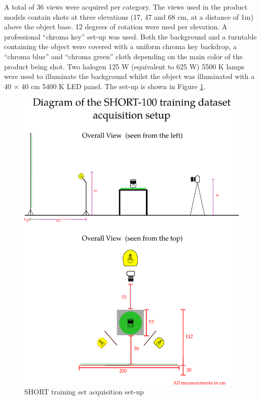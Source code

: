 A total of 36 views were acquired per category. The views used in the product models contain shots at three elevations (17, 47 and 68 cm, at a distance of 1m) above the object base. 12 degrees of rotation were used per elevation. A professional ``chroma key'' set-up was used. Both the background and a turntable containing the object were covered with a uniform chroma key backdrop, a ``chroma blue'' and ``chroma green'' cloth depending on the main color of the product being shot. Two halogen 125 W (equivalent to 625 W) 5500 K lamps were used to illuminate the background whilst the object was illuminated with a 40 $\times$ 40 cm 5400 K LED panel. The set-up is shown in Figure \ref{fig:acqsetup}.


\begin{figure}
\centering
\includegraphics[width=\linewidth]{gfx/Chapter03/acquisition_diagram.pdf}
\caption{SHORT training set acquisition set-up}
\label{fig:acqsetup}
\end{figure}

